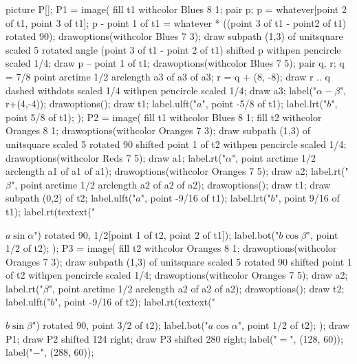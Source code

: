 \documentclass[oneside]{scrbook}
\begin{document}
picture P[];
P1 = image(
    fill t1 withcolor Blues 8 1;
    pair p; p = whatever[point 2 of t1, point 3 of t1];
    p - point 1 of t1 = whatever * ((point 3 of t1 - point2 of t1) rotated 90);
    drawoptions(withcolor Blues 7 3);
    draw subpath (1,3) of unitsquare scaled 5 
        rotated angle (point 3 of t1 - point 2 of t1) 
        shifted p withpen pencircle scaled 1/4;
    draw p -- point 1 of t1;
    drawoptions(withcolor Blues 7 5);
    pair q, r; 
    q = 7/8 point arctime 1/2 arclength a3 of a3 of a3; r = q + (8, -8);
    draw r .. q dashed withdots scaled 1/4 withpen pencircle scaled 1/4;
    draw a3; label("$\alpha-\beta$", r+(4,-4));
    drawoptions();
    draw t1; 
    label.ulft("$a$", point -5/8 of t1);
    label.lrt("$b$", point   5/8 of t1);
);
P2 = image(
    fill t1 withcolor Blues 8 1;
    fill t2 withcolor Oranges 8 1;
    drawoptions(withcolor Oranges 7 3);
    draw subpath (1,3) of unitsquare scaled 5 
        rotated 90
        shifted point 1 of t2
        withpen pencircle scaled 1/4;
    drawoptions(withcolor Reds 7 5);
    draw a1; label.rt("$\alpha$", point arctime 1/2 arclength a1 of a1 of a1);
    drawoptions(withcolor Oranges 7 5);
    draw a2; label.rt("$\beta$", point arctime 1/2 arclength a2 of a2 of a2);
    drawoptions();
    draw t1; draw subpath (0,2) of t2;
    label.ulft("$a$", point -9/16 of t1);
    label.lrt("$b$", point   9/16 of t1);
    label.rt(textext("\strut$a\sin\alpha$") rotated 90, 1/2[point 1 of t2, point 2 of t1]);
    label.bot("$b\cos\beta$", point 1/2 of t2);
);
P3 = image(
    fill t2 withcolor Oranges 8 1;
    drawoptions(withcolor Oranges 7 3);
    draw subpath (1,3) of unitsquare scaled 5 
        rotated 90
        shifted point 1 of t2
        withpen pencircle scaled 1/4;
    drawoptions(withcolor Oranges 7 5);
    draw a2; label.rt("$\beta$", point arctime 1/2 arclength a2 of a2 of a2);
    drawoptions();
    draw t2;
    label.ulft("$b$", point  -9/16 of t2);
    label.rt(textext("\strut$b\sin\beta$") rotated 90, point 3/2 of t2);
    label.bot("$a\cos\alpha$", point 1/2 of t2);
);
draw P1;
draw P2 shifted 124 right;
draw P3 shifted 280 right;
label("$=$", (128, 60));
label("$-$", (288, 60));
\end{document}
